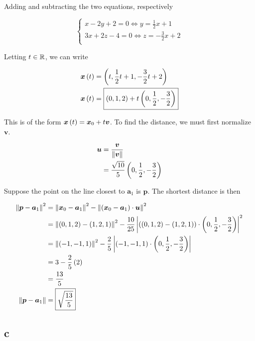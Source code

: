 \documentclass{article}
\begin{document}
Adding and subtracting the two equations, respectively

$$
\begin{cases}
  x - 2y + 2 = 0 \Longleftrightarrow y = \frac{1}{2} x + 1 \\
  3x + 2z - 4 = 0 \Longleftrightarrow z = - \frac{3}{2} x + 2 \\
\end{cases}
$$

Letting $t \in \mathbb R$, we can write

\begin{align*}
  \bm{x} \left ( t \right) &= \left ( t, \frac{1}{2} t + 1, - \frac{3}{2} t + 2 \right) \\
  \bm{x} \left ( t \right) &= \boxed{\left ( 0, 1, 2 \right) + t \left ( 0, \frac{1}{2}, - \frac{3}{2} \right)} \\
\end{align*}

This is of the form $\bm{x} \left ( t \right) = \bm{x}_0 + t \bm{v}$.
To find the distance, we must first normalize $\bm{v}$.

\begin{align*}
  \bm{u} &= \frac{\bm{v}}{\left\lVert\bm{v}\right\rVert} \\
  &= \frac{\sqrt{10}}{5} \left ( 0, \frac{1}{2}, - \frac{3}{2} \right) \\
\end{align*}

Suppose the point on the line closest to $\bm{a}_1$ is $\bm{p}$.
The shortest distance is then

\begin{align*}
  \left\lVert\bm{p} - \bm{a}_1\right\rVert^2 &= \left\lVert\bm{x}_0 - \bm{a}_1\right\rVert^2 - \left\lVert\left ( \bm{x}_0 - \bm{a}_1 \right) \cdot \bm{u}\right\rVert^2 \\
                             &= \left\lVert\left ( 0, 1, 2 \right) - \left ( 1, 2, 1 \right)\right\rVert^2 - \frac{10}{25} \left\lvert \left ( \left ( 0, 1, 2 \right) - \left ( 1, 2, 1 \right) \right) \cdot \left ( 0, \frac{1}{2}, - \frac{3}{2} \right) \right\rvert^2 \\
                             &= \left\lVert\left ( -1, -1, 1 \right)\right\rVert^2 - \frac{2}{5} \left\lvert \left ( -1, -1, 1 \right) \cdot \left ( 0, \frac{1}{2}, - \frac{3}{2} \right) \right\rvert \\
                             &= 3 - \frac{2}{5} \left ( 2 \right) \\
                             &= \frac{13}{5} \\
  \left\lVert\bm{p} - \bm{a}_1\right\rVert &= \boxed{\sqrt{\frac{13}{5}}} \\
\end{align*}

\subsection*{c}
\end{document}
